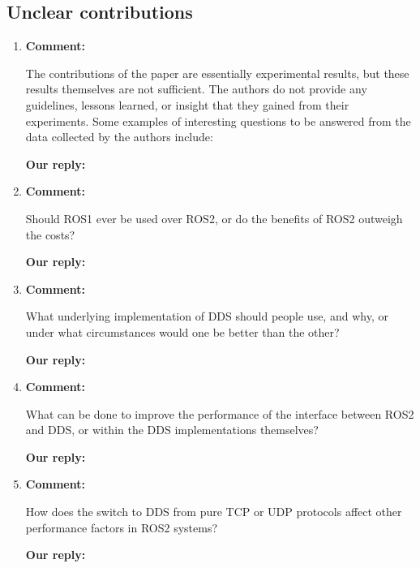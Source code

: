 \documentclass{article}
\begin{document}
\subsection{Unclear contributions}
\begin{enumerate}

\item \begin{flushleft}
    \textbf{Comment:}
  \end{flushleft}
  The contributions of the paper are essentially experimental results, but these results themselves are not sufficient. The authors do not provide any guidelines, lessons learned, or insight that they gained from their experiments.  Some examples of interesting questions to be answered from the data collected by the authors include:

  \begin{flushleft}
    \textbf{Our reply:}
  \end{flushleft}


\item \begin{flushleft}
    \textbf{Comment:}
  \end{flushleft}
  Should ROS1 ever be used over ROS2, or do the benefits of ROS2 outweigh the costs?

  \begin{flushleft}
    \textbf{Our reply:}
  \end{flushleft}


\item \begin{flushleft}
    \textbf{Comment:}
  \end{flushleft}
  What underlying implementation of DDS should people use, and why, or under what circumstances would one be better than the other? 

  \begin{flushleft}
    \textbf{Our reply:}
  \end{flushleft}


\item \begin{flushleft}
    \textbf{Comment:}
  \end{flushleft}
  What can be done to improve the performance of the interface between ROS2 and DDS, or within the DDS implementations themselves?

  \begin{flushleft}
    \textbf{Our reply:}
  \end{flushleft}


\item \begin{flushleft}
    \textbf{Comment:}
  \end{flushleft}
  How does the switch to DDS from pure TCP or UDP protocols affect other performance factors in ROS2 systems? 

  \begin{flushleft}
    \textbf{Our reply:}
  \end{flushleft}

\end{enumerate}
\end{document}
